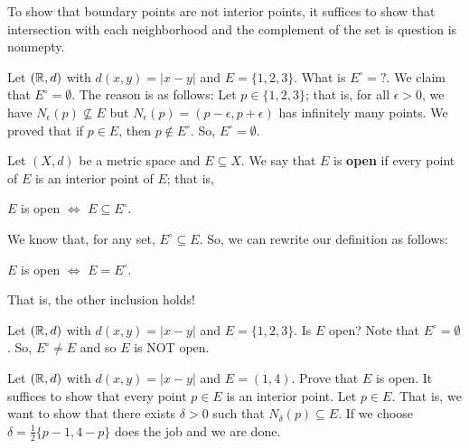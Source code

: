 \documentclass[a4paper]{report}
\begin{document}
To show that boundary points are not interior points, it suffices to show that intersection with each neighborhood and the complement of the set is question is nonmepty.

\begin{eg}
    Let \( (\mathbb{R}, d)  \) with \( d(x,y) = |  x - y  |  \) and \( E = \{ 1,2,3 \}  \). What is \( E^{\circ} = ?  \). We claim that \( E^{\circ} = \emptyset  \). The reason is as follows: Let \( p \in \{ 1,2,3 \}  \); that is, for all \( \epsilon > 0  \), we have \( {N}_{\epsilon}(p) \not\subseteq E  \) but \( {N}_{\epsilon}(p) = (p - \epsilon, p + \epsilon) \) has infinitely many points. We proved that if \( p \in E  \), then \( p \notin E^{\circ} \). So, \( E^{\circ} = \emptyset \).
\end{eg}

\begin{definition}
   Let \( (X,d) \) be a metric space and \( E \subseteq  X \). We say that \( E  \) is \textbf{open} if every point of \( E  \) is an interior point of \( E  \); that is, 
   \begin{center}
       \( E  \) is open \( \Longleftrightarrow  \) \( E \subseteq  E^{\circ} \).
   \end{center}
\end{definition}

\begin{remark}
    We know that, for any set, \( E^{\circ} \subseteq  E  \). So, we can rewrite our definition as follows:
    \begin{center}
        \( E  \) is open \( \Longleftrightarrow  \) \( E = E^{\circ} \).
    \end{center}
    That is, the other inclusion holds!
\end{remark}

\begin{eg}
    Let \( (\mathbb{R} ,d ) \) with \( d(x,y) = | x -y  |  \) and \( E = \{ 1,2,3 \}  \). Is \( E  \) open? Note that \( E^{\circ} = \emptyset  \). So, \( E^{\circ} \neq E  \) and so \( E  \) is NOT open.
\end{eg}

\begin{eg}
    Let \( (\mathbb{R},d) \) with \( d(x,y) = |  x - y  |  \) and \( E = (1,4) \). Prove that \( E  \) is open. It suffices to show that every point \( p \in E   \) is an interior point. Let \(  p \in E  \). That is, we want to show that there exists \( \delta > 0  \) such that \( {N}_{\delta}(p) \subseteq  E  \). If we choose \( \delta = \frac{ 1 }{ 2 }  \{ p - 1 , 4 - p \}  \) does the job and we are done.
\end{eg}
\end{document}

